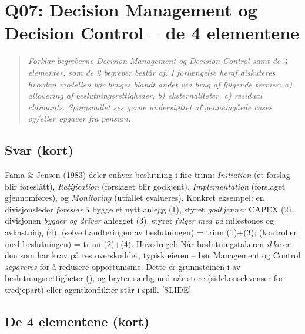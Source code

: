 \section{Q07: Decision Management og Decision Control -- de 4 elementene}\label{q:07}

\begin{quote}
\emph{Forklar begreberne Decision Management og Decision Control samt de 4 elementer, som de 2 begreber består af. I forlængelse heraf diskuteres hvordan modellen bør bruges blandt andet ved brug af følgende termer: a) allokering af beslutningsrettigheder, b) eksternaliteter, c) residual claimants. Spørgsmålet ses gerne understøttet af gennemgåede cases og/eller opgaver fra pensum.}
\end{quote}

\subsection*{Svar (kort)}
Fama \& Jensen (1983) deler enhver beslutning i fire trinn: \emph{Initiation} (et forslag blir foreslått), \emph{Ratification} (forslaget blir godkjent), \emph{Implementation} (forslaget gjennomføres), og \emph{Monitoring} (utfallet evalueres). Konkret eksempel: en divisjonsleder \emph{foreslår} å bygge et nytt anlegg (1), styret \emph{godkjenner} CAPEX (2), divisjonen \emph{bygger og driver} anlegget (3), styret \emph{følger med på} milestones og avkastning (4).  (selve håndteringen av beslutningen) = trinn (1)+(3);  (kontrollen med beslutningen) = trinn (2)+(4). Hovedregel: Når beslutningstakeren \emph{ikke} er  -- den som har krav på restoverskuddet, typisk eieren -- bør Management og Control \emph{separeres} for å redusere opportunisme. Dette er grunnsteinen i  av beslutningsrettigheter (\SOne), og bryter særlig ned når store  (sidekonsekvenser for tredjepart) eller agentkonflikter står i spill. [SLIDE]

\subsection*{De 4 elementene (kort)}

